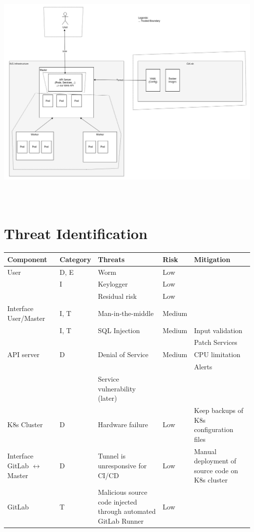 \includegraphics[height=12cm]{resources/architecture_threat_model.png}


\section{Threat Identification}

\begin{tabular*}{\textwidth}{p{2.1cm} p{1.8cm} p{3cm} p{2cm} p{3.5cm}}
    \textbf{Component} & \textbf{Category} & \textbf{Threats} & \textbf{Risk} & \textbf{Mitigation} \\
    \hline
    User                & D, E & Worm & Low & \\
                        & I & Keylogger & Low & \\
                        & & Residual risk & Low & \\
    \hline
    Interface User/Master   & I, T & Man-in-the-middle & Medium & \\
                            & I, T & SQL Injection & Medium & Input validation \\
                            & & & & Patch Services \\
    \hline
    API server          & D & Denial of Service & Medium & CPU limitation \\
                        & & & & Alerts \\
                        & & Service vulnerability (later) & & \\
    \hline
    K8s Cluster             & D & Hardware failure & Low & Keep backups of K8s configuration files \\
    \hline
    Interface GitLab \(\leftrightarrow\) Master & D & Tunnel is unresponsive for CI/CD & Low & Manual deployment of source code on K8s cluster \\
    \hline
    GitLab             & T & Malicious source code injected through automated GitLab Runner & Low & \\ 
    \hline
\end{tabular*}


